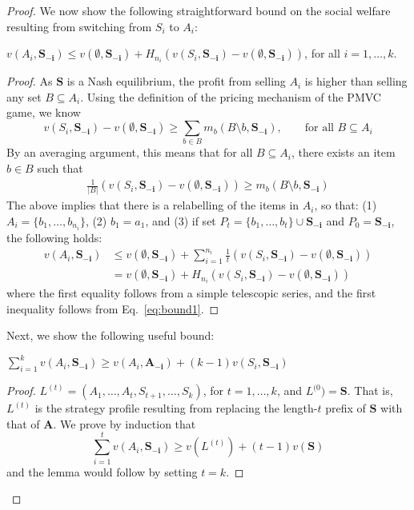 \begin{proof}
  We now show the following straightforward bound on the social
  welfare resulting from switching from $S_i$ to $A_i$:
  \begin{lemma}
\label{lem:poa_bound1}
\small
    $v(A_i,\mathbf{S_{-i}}) \leq v(\emptyset,\mathbf{S_{-i}}) + H_{n_i} (v(S_i,\mathbf{S_{-i}}) -
    v(\emptyset,\mathbf{S_{-i}}))$, for all $i=1,\ldots,k$.
    \normalsize
  \end{lemma}
  \begin{proof}
  As $\mathbf{S}$ is a Nash equilibrium, the profit from selling $A_{i}$ is higher than selling any set $B\subseteq A_{i}$. Using the definition of the pricing mechanism of the PMVC game, we know
\small  \[ v(S_i,\mathbf{S_{-i}}) - v(\emptyset, \mathbf{S_{-i}}) \geq
  \sum_{b \in B}m_b(B \setminus b,\mathbf{S_{-i}}), \quad\quad
  \text {for all } B \subseteq A_i \]
\normalsize  
  By an averaging argument, this means that for all $B \subseteq A_i$, there exists an item $b \in
B$ such that
\small
\begin{align}
\label{eq:bound1}
\frac{1}{|B|} (v(S_i,\mathbf{S_{-i}}) - v(\emptyset,
\mathbf{S_{-i}})) \geq m_b(B \setminus b,\mathbf{S_{-i}})
\end{align}
\normalsize
The above implies that there is a relabelling of the items in $A_i$,
so that: (1) $A_i=\{b_1,\ldots,b_{n_i}\}$, (2) $b_1 = a_1$, and (3) if
set $P_t = \{b_1,\ldots,b_t\}\cup \mathbf{S_{-i}}$ and $P_0=\mathbf{S_{-i}}$, the following holds:
\small
\begin{align*}
  v(A_i,\mathbf{S_{-i}}) &%
  \leq v(\emptyset,\mathbf{S_{-i}})+\sum_{i=1}^{n_i}\frac{1}{t}(v(S_i,\mathbf{S_{-i}}) - v(\emptyset,\mathbf{S_{-i}}))\\
& = v(\emptyset,\mathbf{S_{-i}})+H_{n_i}(v(S_i,\mathbf{S_{-i}}) - v(\emptyset,\mathbf{S_{-i}}))
\end{align*}
\normalsize
where the first equality follows from a simple telescopic series, and
the first inequality follows from Eq.~\ref{eq:bound1}.
  \end{proof} %
Next, we show the following useful bound:
\begin{lemma}
\label{lem:poa_bound2}
  $\sum_{i=1}^k v(A_i,\mathbf{S_{-i}}) \geq v(A_i, \mathbf{A_{-i}}) +
  (k-1)v(S_i, \mathbf{S_{-i}}) $
\end{lemma}
\begin{proof}
  $L^{(t)}=(A_1,\ldots,A_t,S_{t+1},\ldots,S_k)$, for $t=1,\ldots,k$,
  and $L^{(0})=\mathbf{S}$. That is, $L^{(t)}$ is the strategy profile
  resulting from replacing the length-$t$ prefix of $\mathbf{S}$ with
  that of $\mathbf{A}$. 
  We prove by induction that
\small  \[\sum_{i=1}^t v(A_i,\mathbf{S_{-i}}) \geq v(L^{(t)}) +
  (t-1)v(\mathbf{S})\]\normalsize
and the lemma would follow by setting $t=k$.
  

\end{proof}
\end{proof}

